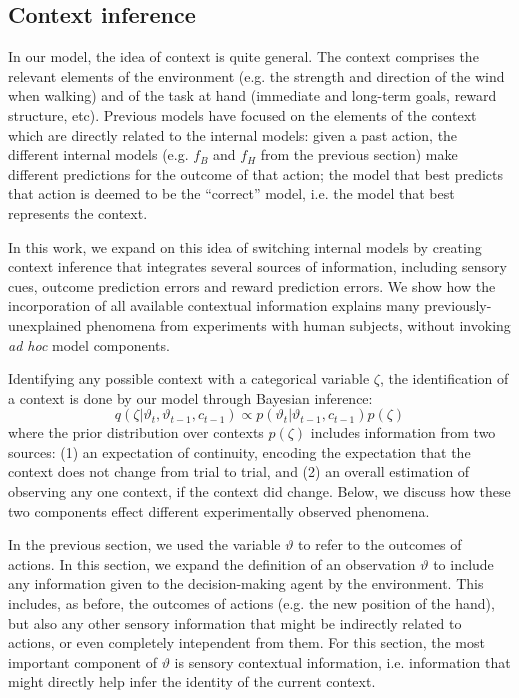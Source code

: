\documentclass[a4paper,doc,floatsintext,natbib]{apa6}
\begin{document}
\subsection{Context inference}
In our model, the idea of context is quite general. The context comprises the relevant elements of the environment (e.g. the strength and direction of the wind when walking) and of the task at hand (immediate and long-term goals, reward structure, etc). Previous models \cite[e.g.][]{Wolpert_Multiple_1998a,Imamizu_Neural_2008,Oh_Minimizing_2019} have focused on the elements of the context which are directly related to the internal models: given a past action, the different internal models (e.g. $f_B$ and $f_H$ from the previous section) make different predictions for the outcome of that action; the model that best predicts that action is deemed to be the ``correct'' model, i.e. the model that best represents the context.

In this work, we expand on this idea of switching internal models by creating context inference that integrates several sources of information, including sensory cues, outcome prediction errors and reward prediction errors.  We show how the incorporation of all available contextual information explains many previously-unexplained phenomena from experiments with human subjects, without invoking \textit{ad hoc} model components.

Identifying any possible context with a categorical variable $\zeta$, the identification of a context is done by our model through Bayesian inference:
\begin{equation}
q(\zeta | \vartheta_t, \vartheta_{t-1}, c_{t-1}) \propto p(\vartheta_t | \vartheta_{t-1}, c_{t-1})p(\zeta)
\end{equation}
where the prior distribution over contexts $p(\zeta)$ includes information from two sources: (1) an expectation of continuity, encoding the expectation that the context does not change from trial to trial, and (2) an overall estimation of observing any one context, if the context did change. Below, we discuss how these two components effect different experimentally observed phenomena.

In the previous section, we used the variable $\vartheta$ to refer to the outcomes of actions. In this section, we expand the definition of an observation $\vartheta$ to include any information given to the decision-making agent by the environment. This includes, as before, the outcomes of actions (e.g. the new position of the hand), but also any other sensory information that might be indirectly related to actions, or even completely intependent from them. For this section, the most important component of $\vartheta$ is sensory contextual information, i.e. information that might directly help infer the identity of the current context.
\end{document}
